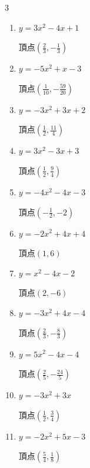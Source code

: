 \begin{multicols}{3}
\begin{enumerate}
  \item $\displaystyle y=3x^{2}-4x+1$

        $\displaystyle 頂点\left( \frac{2}{3} , -\frac{1}{3} \right)$

  \item $\displaystyle y=-5x^{2}+x-3$

        $\displaystyle 頂点\left( \frac{1}{10} , -\frac{59}{20} \right)$

  \item $\displaystyle y=-3x^{2}+3x+2$

        $\displaystyle 頂点\left( \frac{1}{2} , \frac{11}{4} \right)$

\columnbreak %

  \item $\displaystyle y=3x^{2}-3x+3$

        $\displaystyle 頂点\left( \frac{1}{2} , \frac{9}{4} \right)$

  \item $\displaystyle y=-4x^{2}-4x-3$

        $\displaystyle 頂点\left( -\frac{1}{2} , -2 \right)$

  \item $\displaystyle y=-2x^{2}+4x+4$

        $\displaystyle 頂点\left( 1 , 6 \right)$

  \item $\displaystyle y=x^{2}-4x-2$

        $\displaystyle 頂点\left( 2 , -6 \right)$

  \item $\displaystyle y=-3x^{2}+4x-4$

        $\displaystyle 頂点\left( \frac{2}{3} , -\frac{8}{3} \right)$

\columnbreak %

\resetques

  \item $\displaystyle y=5x^{2}-4x-4$

        $\displaystyle 頂点\left( \frac{2}{5} , -\frac{24}{5} \right)$

  \item $\displaystyle y=-3x^{2}+3x$

        $\displaystyle 頂点\left( \frac{1}{2} , \frac{3}{4} \right)$

  \item $\displaystyle y=-2x^{2}+5x-3$

        $\displaystyle 頂点\left( \frac{5}{4} , \frac{1}{8} \right)$


\end{enumerate}
\end{multicols}
